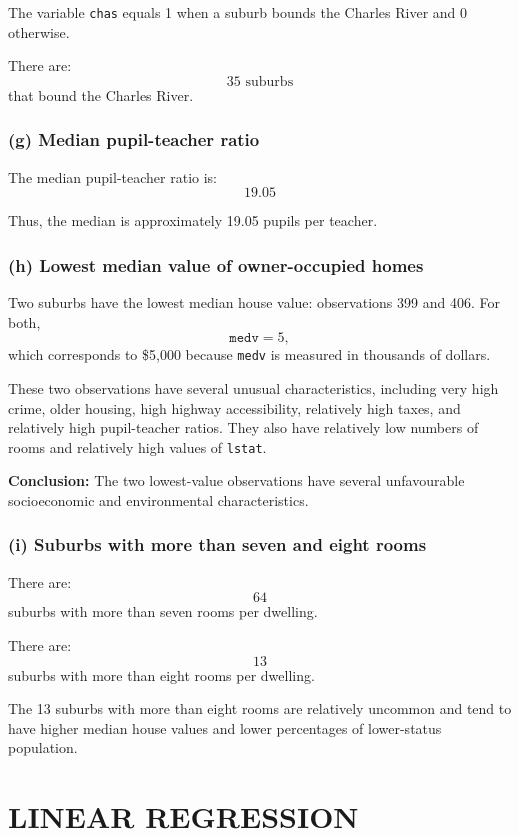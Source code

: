 \documentclass[12pt,a4paper]{article}
\begin{document}
The variable \texttt{chas} equals 1 when a suburb bounds the Charles River
and 0 otherwise.

There are:
\[
\boxed{35\text{ suburbs}}
\]
that bound the Charles River.

\subsubsection*{(g) Median pupil-teacher ratio}

The median pupil-teacher ratio is:
\[
\boxed{19.05}
\]

Thus, the median is approximately 19.05 pupils per teacher.

\subsubsection*{(h) Lowest median value of owner-occupied homes}

Two suburbs have the lowest median house value: observations 399 and 406.
For both,
\[
\texttt{medv}=5,
\]
which corresponds to \$5,000 because \texttt{medv} is measured in thousands
of dollars.

These two observations have several unusual characteristics, including
very high crime, older housing, high highway accessibility, relatively high
taxes, and relatively high pupil-teacher ratios. They also have relatively
low numbers of rooms and relatively high values of \texttt{lstat}.

\textbf{Conclusion:} The two lowest-value observations have several
unfavourable socioeconomic and environmental characteristics.

\subsubsection*{(i) Suburbs with more than seven and eight rooms}

There are:
\[
\boxed{64}
\]
suburbs with more than seven rooms per dwelling.

There are:
\[
\boxed{13}
\]
suburbs with more than eight rooms per dwelling.

The 13 suburbs with more than eight rooms are relatively uncommon and tend
to have higher median house values and lower percentages of lower-status
population.

\newpage

\section*{LINEAR REGRESSION}
\end{document}
